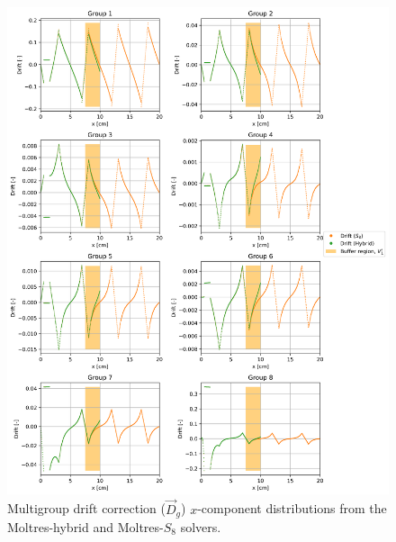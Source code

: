 \documentclass[letterpaper]{mc2025}
\begin{document}
\begin{figure}[htb!]
  \centering
  \includegraphics[width=\columnwidth]{case-3b-drift}
  \caption{Multigroup drift correction ($\vec{D}_g$) $x$-component distributions from the
  Moltres-hybrid and Moltres-$S_8$ solvers.}
  \label{fig:3b-drift}
\end{figure}
\end{document}
